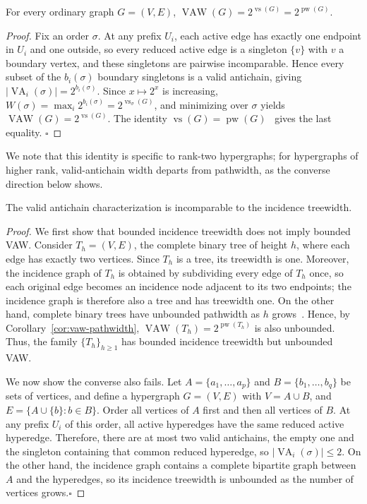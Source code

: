 \begin{corollary}\label{cor:vaw-pathwidth}
For every ordinary graph $G=(V,E)$, $\operatorname{VAW}(G)=2^{\operatorname{vs}(G)}=2^{\operatorname{pw}(G)}$.
\end{corollary}

\begin{proof}
Fix an order $\sigma$. At any prefix $U_i$, each active edge has exactly one endpoint in $U_i$ and one outside, so every reduced active edge is a singleton $\{v\}$ with $v$ a boundary vertex, and these singletons are pairwise incomparable. Hence every subset of the $b_i(\sigma)$ boundary singletons is a valid antichain, giving $|\operatorname{VA}_i(\sigma)|=2^{b_i(\sigma)}$. Since $x\mapsto 2^x$ is increasing, $W(\sigma)=\max_i 2^{b_i(\sigma)}=2^{\operatorname{vs}_\sigma(G)}$, and minimizing over $\sigma$ yields $\operatorname{VAW}(G)=2^{\operatorname{vs}(G)}$. The identity $\operatorname{vs}(G)=\operatorname{pw}(G)$~\cite{kinnersley1992pathwidth} gives the last equality. \hfill$\square$
\end{proof}

We note that this identity is specific to rank-two hypergraphs; for hypergraphs of higher rank, valid-antichain width departs from pathwidth, as the converse direction below shows.


\begin{proposition} \label{prop:va-vs-treewidth}
The valid antichain characterization is incomparable to the incidence treewidth.
\end{proposition}

\begin{proof}
We first show that bounded incidence treewidth does not imply bounded VAW. Consider $T_h=(V,E)$, the complete binary tree of height $h$, where each edge has exactly two vertices. Since $T_h$ is a tree, its treewidth is one. Moreover, the incidence graph of $T_h$ is obtained by subdividing every edge of $T_h$ once, so each original edge becomes an incidence node adjacent to its two endpoints; the incidence graph is therefore also a tree and has treewidth one. On the other hand, complete binary trees have unbounded pathwidth as $h$ grows~\cite{diestel2017graph}. Hence, by Corollary~\ref{cor:vaw-pathwidth}, $\operatorname{VAW}(T_h)=2^{\operatorname{pw}(T_h)}$ is also unbounded. Thus, the family $\{T_h\}_{h\ge 1}$ has bounded incidence treewidth but unbounded VAW.

We now show the converse also fails. Let $A=\{a_1,\ldots,a_p\}$ and
$B=\{b_1,\ldots,b_q\}$ be sets of vertices, and define a hypergraph $G=(V,E)$ with $V=A\cup B$, and $E=\{A\cup\{b\}: b\in B\}$. Order all vertices of $A$ first and then all vertices of $B$. At any prefix $U_i$ of this order, all active hyperedges have the same reduced active hyperedge. Therefore, there are at most two valid antichains, the empty one and the singleton containing that common
reduced hyperedge, so $|\operatorname{VA}_i(\sigma)| \le 2$. On the other hand, the incidence graph contains a complete bipartite graph between $A$ and the hyperedges, so its incidence treewidth is unbounded as the number of vertices grows.\hfill$\square$
\end{proof}

